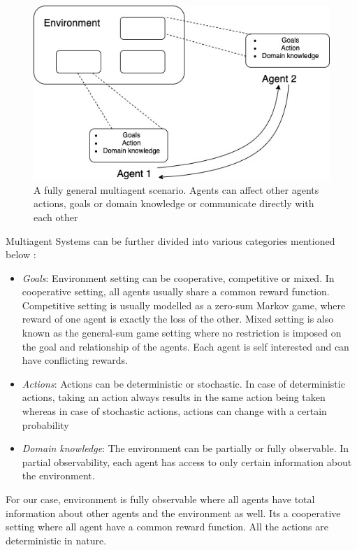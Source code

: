 \documentclass[12pt]{report}
\begin{document}
\begin{figure}[!h]
    \centering
    \includegraphics[width=12cm]{MultiAgentScenario.jpg}
    \caption{A fully general multiagent scenario. Agents can affect other agents actions, goals or domain knowledge or communicate directly with each other \cite{Stone}}
    \label{fig:MultiAgentSystem}
\end{figure}


Multiagent Systems can be further divided into various categories mentioned below \cite{SurveyandArticle}:

\begin{itemize}
    \item \emph{Goals}: Environment setting can be cooperative, competitive or mixed. In cooperative setting, all agents usually share a common reward function. Competitive setting is usually modelled as a zero-sum Markov game, where reward of one agent is exactly the loss of the other. Mixed setting is also known as the general-sum game setting where no restriction is imposed on the goal and relationship of the agents. Each agent is self interested and can have conflicting rewards.
    \item \emph{Actions}: Actions can be deterministic or stochastic. In case of deterministic actions, taking an action always results in the same action being taken whereas in case of stochastic actions, actions can change with a certain probability
    \item \emph{Domain knowledge}: The environment can be partially or fully observable. In partial observability, each agent has access to only certain information about the environment. 
\end{itemize}

For our case, environment is fully observable where all agents have total information about other agents and the environment as well. Its a cooperative setting where all agent have a common reward function. All the actions are deterministic in nature. 
\end{document}
